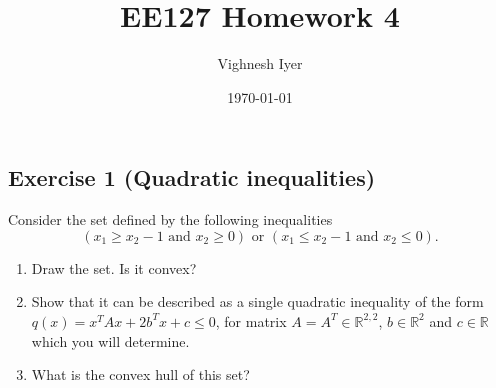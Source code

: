 \documentclass[11pt]{article}
\begin{document}
\title{EE127 Homework 4}
\author{Vighnesh Iyer}
\date{\today}
\maketitle

\subsection*{Exercise 1 (Quadratic inequalities)}

Consider the set defined by the following inequalities
\[
\left( x_1 \ge x_2 - 1 \mbox{ and } x_2 \ge 0 \right) \mbox{ or }
\left( x_1 \le x_2 - 1  \mbox{ and } x_2 \le 0 \right).
\]
\begin{enumerate}
\item
Draw the set.  Is it convex?
\item
Show that it can be described as a single quadratic inequality of the form $q(x) = x^T A x + 2 b^T x + c \leq 0$, for matrix $A=A^T  \in \mathbb{R}^{2,2}$, $b \in \mathbb{R}^{2}$ and $c \in \mathbb{R}$ which you will determine.
\item What is the convex hull of this set?
\end{enumerate}
\end{document}
